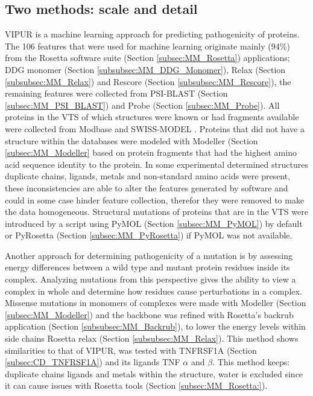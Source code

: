 \subsection{Two methods: scale and detail}
VIPUR is a machine learning approach for predicting pathogenicity of proteins. The 106 features that were used for machine learning originate mainly (94\%) from the Rosetta software suite (Section \ref{subsec:MM_Rosetta}) applications; DDG monomer (Section \ref{subsubsec:MM_DDG_Monomer}), Relax (Section \ref{subsubsec:MM_Relax}) and Rescore (Section \ref{subsubsec:MM_Rescore}), the remaining features were collected from PSI-BLAST (Section \ref{subsec:MM_PSI_BLAST}) and Probe (Section \ref{subsec:MM_Probe}). 
All proteins in the VTS of which structures were known or had fragments available were collected from Modbase \cite{} and
SWISS-MODEL \cite{}.
Proteins that did not have a structure within the databases were modeled with Modeller (Section \ref{subsec:MM_Modeller} based on protein fragments that had the highest amino acid sequence identity to the protein.
In some experimental determined structures duplicate chains, ligands, metals and non-standard amino acids were present, these inconsistencies are able to alter the features generated by software and could in some case hinder feature collection, therefor they were removed to make the data homogeneous. Structural mutations of proteins that are in the VTS were introduced by a script using PyMOL (Section \ref{subsec:MM_PyMOL}) by default or PyRosetta (Section \ref{subsec:MM_PyRosetta}) if PyMOL was not available.



Another approach for determining pathogenicity of a mutation is by assessing energy differences between a wild type and mutant protein residues inside its complex. Analyzing mutations from this perspective gives the ability to view a complex in whole and determine how residues cause perturbations in a complex. Missense mutations in monomers of complexes were made with Modeller (Section \ref{subsec:MM_Modeller}) and the backbone was refined with Rosetta's backrub application (Section \ref{subsubsec:MM_Backrub}), to lower the energy levels within side chains Rosetta relax (Section \ref{subsubsec:MM_Relax}). This method shows similarities to that of VIPUR,  was tested with TNFRSF1A (Section \ref{subsec:CD_TNFRSF1A}) and its ligands TNF $\alpha$ and $\beta$. This method keeps: duplicate chains ligands and metals within the structure, water is excluded since it can cause issues with Rosetta tools (Section \ref{subsec:MM_Rosetta:}).

